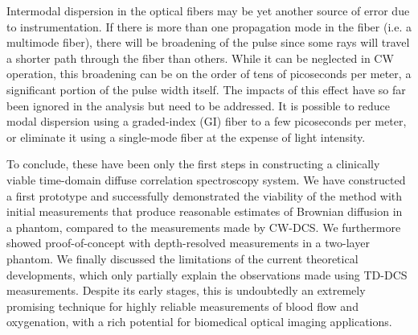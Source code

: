 Intermodal dispersion in the optical fibers may be yet another source of error due to instrumentation. If there is more than one propagation mode in the fiber (i.e. a multimode fiber), there will be broadening of the pulse since some rays will travel a shorter path through the fiber than others. While it can be neglected in CW operation, this broadening can be on the order of tens of picoseconds per meter, a significant portion of the pulse width itself. The impacts of this effect have so far been ignored in the analysis but need to be addressed. It is possible to reduce modal dispersion using a graded-index (GI) fiber to a few picoseconds per meter, or eliminate it using a single-mode fiber at the expense of light intensity.

To conclude, these have been only the first steps in constructing a clinically viable time-domain diffuse correlation spectroscopy system. We have constructed a first prototype and successfully demonstrated the viability of the method with initial measurements that produce reasonable estimates of Brownian diffusion in a phantom, compared to the measurements made by CW-DCS. We furthermore showed proof-of-concept with depth-resolved measurements in a two-layer phantom. We finally discussed the limitations of the current theoretical developments, which only partially explain the observations made using TD-DCS measurements. Despite its early stages, this is undoubtedly an extremely promising technique for highly reliable measurements of blood flow and oxygenation, with a rich potential for biomedical optical imaging applications.



%